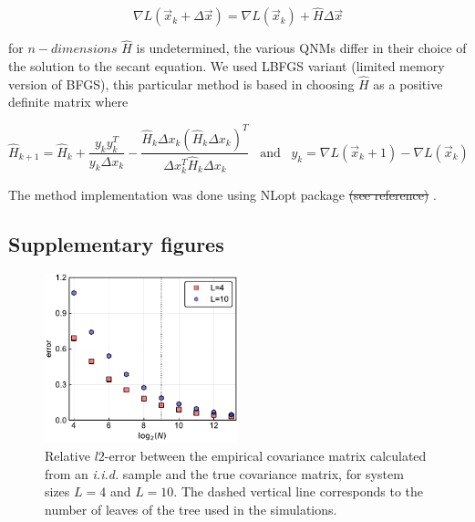 \documentclass[preprint,amsmath,amssymb,superscriptaddress,showpacs,pre]{revtex4-1}
\newcommand{\pierre}[1]{{\color{red}Pierre: #1}}
\providecommand{\DIFadd}[1]{{\protect\color{blue}\uwave{#1}}} %
\providecommand{\DIFdel}[1]{{\protect\color{red}\sout{#1}}}                      %
\providecommand{\DIFaddbegin}{} %
\providecommand{\DIFaddend}{} %
\providecommand{\DIFdelbegin}{} %
\providecommand{\DIFdelend}{} %
\providecommand{\DIFaddbeginFL}{} %
\providecommand{\DIFaddendFL}{} %
\providecommand{\DIFdelbeginFL}{} %
\providecommand{\DIFdelendFL}{} %
\newcommand{\DIFscaledelfig}{0.5}
\newlength{\DIFdelgraphicswidth} %
\newlength{\DIFdelgraphicsheight} %
\newcommand{\DIFaddincludegraphics}[2][]{{\color{blue}\fbox{\DIFOincludegraphics[#1]{#2}}}} %
\newcommand{\DIFdelincludegraphics}[2][]{%
\sbox{\DIFdelgraphicsbox}{\DIFOincludegraphics[#1]{#2}}%
\settoboxwidth{\DIFdelgraphicswidth}{\DIFdelgraphicsbox} %
\settoboxtotalheight{\DIFdelgraphicsheight}{\DIFdelgraphicsbox} %
\scalebox{\DIFscaledelfig}{%
\parbox[b]{\DIFdelgraphicswidth}{\usebox{\DIFdelgraphicsbox}\\[-\baselineskip] \rule{\DIFdelgraphicswidth}{0em}}\llap{\resizebox{\DIFdelgraphicswidth}{\DIFdelgraphicsheight}{%
\setlength{\unitlength}{\DIFdelgraphicswidth}%
\begin{picture}(1,1)%
\thicklines\linethickness{2pt} %
{\color[rgb]{1,0,0}\put(0,0){\framebox(1,1){}}}%
{\color[rgb]{1,0,0}\put(0,0){\line( 1,1){1}}}%
{\color[rgb]{1,0,0}\put(0,1){\line(1,-1){1}}}%
\end{picture}%
}\hspace*{3pt}}} %
} %
\DeclareRobustCommand{\DIFaddbegin}{\DIFOaddbegin \let\includegraphics\DIFaddincludegraphics} %
\DeclareRobustCommand{\DIFaddend}{\DIFOaddend \let\includegraphics\DIFOincludegraphics} %
\DeclareRobustCommand{\DIFdelbegin}{\DIFOdelbegin \let\includegraphics\DIFdelincludegraphics} %
\DeclareRobustCommand{\DIFdelend}{\DIFOaddend \let\includegraphics\DIFOincludegraphics} %
\DeclareRobustCommand{\DIFaddbeginFL}{\DIFOaddbeginFL \let\includegraphics\DIFaddincludegraphics} %
\DeclareRobustCommand{\DIFaddendFL}{\DIFOaddendFL \let\includegraphics\DIFOincludegraphics} %
\DeclareRobustCommand{\DIFdelbeginFL}{\DIFOdelbeginFL \let\includegraphics\DIFdelincludegraphics} %
\DeclareRobustCommand{\DIFdelendFL}{\DIFOaddendFL \let\includegraphics\DIFOincludegraphics} %
\begin{document}
$$\nabla L(\vec{x}_k+\Delta\vec{x})=\nabla L(\vec{x}_k)+\hat{H} \Delta\vec{x} $$


for $n-dimensions$ $\hat{H}$ is undetermined, the various QNMs differ in their choice of the solution to the secant equation. We used LBFGS variant  (limited memory version of BFGS), this particular method is based in choosing $\hat{H}$ as a positive definite matrix where

$$\hat{H}_{k+1}=\hat{H}_{k}+\frac{y_k y^{T}_k}{y_k\Delta x_k} - \frac{\hat{H}_k\Delta x_k(\hat{H}_k\Delta x_k)^T}{\Delta x^T_k\hat{H}_k\Delta x_k} \;\;\;\text{and}\;\;\; y_k=\nabla L(\vec{x}_k+1)-\nabla L(\vec{x}_k)$$

The method implementation was done using   NLopt package \DIFdelbegin \DIFdel{(see reference) }%
\DIFdelend \DIFaddbegin \DIFadd{\mbox{%
\cite{NLopt} }\hspace{0pt}%
}\DIFaddend .

\subsection{Supplementary figures}
\label{sub:supplementary_figures}

\begin{figure}[!htb]
	\centering
	\DIFdelbeginFL %
\DIFdelendFL \DIFaddbeginFL \includegraphics[keepaspectratio=true,width=0.5\textwidth]{Figures/error_Ciid_vs_numb_of_seq.pdf}
	\DIFaddendFL \caption{Relative $l2$-error between the empirical covariance matrix calculated from an \emph{i.i.d.} sample and the true covariance matrix, for system sizes $L=4$ and $L=10$. The dashed vertical line corresponds to the number of leaves of the tree used in the simulations.}
	\label{fig:error_vs_nseqs}
\end{figure}
\end{document}
